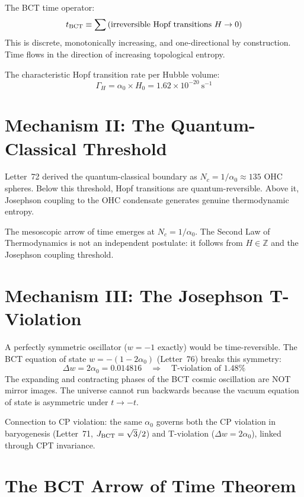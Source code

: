 \documentclass[aps,prl,twocolumn,showpacs,superscriptaddress]{revtex4-2}
\begin{document}
The BCT time operator:
\begin{equation}
    t_{\rm BCT} \equiv \sum \text{(irreversible Hopf transitions } H \to 0)
\end{equation}
This is discrete, monotonically increasing, and one-directional by 
construction. Time flows in the direction of increasing topological entropy.

The characteristic Hopf transition rate per Hubble volume:
\begin{equation}
    \Gamma_H = \alpha_0 \times H_0 = 1.62 \times 10^{-20}~\text{s}^{-1}
\end{equation}

\section{Mechanism II: The Quantum-Classical Threshold}

Letter~72 derived the quantum-classical boundary as $N_c = 1/\alpha_0 \approx 
135$ OHC spheres. Below this threshold, Hopf transitions are quantum-reversible. 
Above it, Josephson coupling to the OHC condensate generates genuine 
thermodynamic entropy.

The mesoscopic arrow of time emerges at $N_c = 1/\alpha_0$. The Second Law 
of Thermodynamics is not an independent postulate: it follows from $H \in 
\mathbb{Z}$ and the Josephson coupling threshold.

\section{Mechanism III: The Josephson T-Violation}

A perfectly symmetric oscillator ($w = -1$ exactly) would be time-reversible. 
The BCT equation of state $w = -(1-2\alpha_0)$ (Letter~76) breaks this 
symmetry:
\begin{equation}
    \Delta w = 2\alpha_0 = 0.014816 \quad \Rightarrow \quad 
    \text{T-violation of } 1.48\%
\end{equation}
The expanding and contracting phases of the BCT cosmic oscillation are 
NOT mirror images. The universe cannot run backwards because the vacuum 
equation of state is asymmetric under $t \to -t$.

Connection to CP violation: the same $\alpha_0$ governs both the CP violation 
in baryogenesis (Letter~71, $J_{\rm BCT} = \sqrt{3}/2$) and T-violation 
($\Delta w = 2\alpha_0$), linked through CPT invariance.

\section{The BCT Arrow of Time Theorem}
\end{document}
